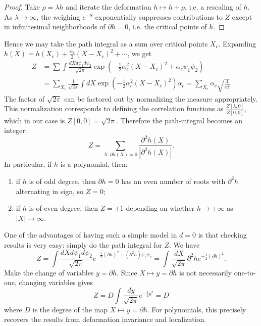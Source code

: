 \documentclass{report}
\theoremstyle{plain}
\theoremstyle{definition}
\theoremstyle{remark}
\newcommand{\di}{\partial}
\newcommand{\FR}[2]{\frac{#1}{#2}}
\newcommand{\SFR}[2]{\sqrt{\frac{#1}{#2}}}
\begin{document}
\begin{proof}
  Take $\rho = \lambda h$ and iterate the deformation $h \mapsto h +
  \rho$, i.e. a rescaling of $h$. As $\lambda \to \infty$, the
  weighing $e^{-S}$ exponentially suppresses contributions to $Z$
  except in infinitesimal neighborhoods of $\di h = 0$, i.e. the
  critical points of $h$.
\end{proof}

Hence we may take the path integral as a sum over critical points
$X_c$. Expanding $h(X) = h(X_c)+\FR{\alpha_c}{2}(X-X_c)^2 + \cdots$,
we get
\begin{align*}
    Z &= \sum \int \FR{dXd\psi_1d\psi_2}{\sqrt{2\pi}}
    \exp\left(-\FR{1}{2}\alpha_c^2(X-X_c)^2 + \alpha_c\psi_1\psi_2\right)\\
    &= \sum_{X_c} \FR{1}{\sqrt{2\pi}}\int dX
    \exp\left(-\FR{1}{2}\alpha_c^2(X-X_c)^2\right) \alpha_c
    = \sum_{X_c} \alpha_c \SFR{1}{\alpha_c^2}
\end{align*}
The factor of $\sqrt{2\pi}$ can be factored out by normalizing the
measure appropriately. This normalization corresponds to defining the
correlation functions as $\FR{Z[\lambda,0]}{Z[0,0]}$, which in our
case is $Z[0,0]=\sqrt{2\pi}$. Therefore the path-integral becomes an
integer:
\[ Z = \sum_{X \colon \di h(X)=0} \FR{\di^2 h(X)}{|\di^2 h(X)|}.\]
In particular, if $h$ is a polynomial, then:
\begin{enumerate}
\item if $h$ is of odd degree, then $\di h = 0$ has an even number of
  roots with $\di^2h$ alternating in sign, so $Z = 0$;
\item if $h$ is of even degree, then $Z = \pm 1$ depending on whether
  $h \to \pm \infty$ as $|X| \to \infty$.
\end{enumerate}

One of the advantages of having such a simple model in $d=0$ is that
checking results is very easy: simply do the path integral for $Z$. We
have
\[ Z = \int \frac{dX d\psi_1 d\psi_2}{\sqrt{2\pi}} e^{-\frac{1}{2}(\di h)^2 + (\di^2 h) \psi_1 \psi_2} = \int \frac{dX}{\sqrt{2\pi}}  \di^2 h e^{-\frac{1}{2}(\di h)^2}. \]
Make the change of variables $y = \di h$. Since $X \mapsto y = \di h$
is not necessarily one-to-one, changing variables gives
\[ Z = D \int \frac{dy}{\sqrt{2\pi}} e^{-\frac{1}{2}y^2} = D \]
where $D$ is the degree of the map $X \mapsto y = \di h$. For
polynomials, this precisely recovers the results from deformation
invariance and localization.
\end{document}
